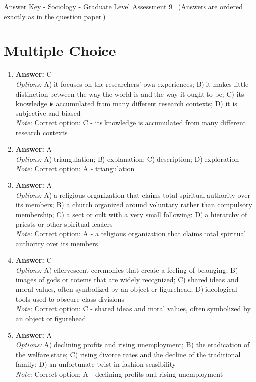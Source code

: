 \documentclass[12pt]{article}
\begin{document}
\begin{center}
Answer Key - Sociology - Graduate Level Assessment 9 \
\small (Answers are ordered exactly as in the question paper.)
\end{center}

\section*{Multiple Choice}
\begin{enumerate}[label=\arabic*.]
\item \textbf{Answer:} C
\\ \textit{Options:} A) it focuses on the researchers' own experiences; B) it makes little distinction between the way the world is and the way it ought to be; C) its knowledge is accumulated from many different research contexts; D) it is subjective and biased
\\ \textit{Note:} Correct option: C - its knowledge is accumulated from many different research contexts
\item \textbf{Answer:} A
\\ \textit{Options:} A) triangulation; B) explanation; C) description; D) exploration
\\ \textit{Note:} Correct option: A - triangulation
\item \textbf{Answer:} A
\\ \textit{Options:} A) a religious organization that claims total spiritual authority over its members; B) a church organized around voluntary rather than compulsory membership; C) a sect or cult with a very small following; D) a hierarchy of priests or other spiritual leaders
\\ \textit{Note:} Correct option: A - a religious organization that claims total spiritual authority over its members
\item \textbf{Answer:} C
\\ \textit{Options:} A) effervescent ceremonies that create a feeling of belonging; B) images of gods or totems that are widely recognized; C) shared ideas and moral values, often symbolized by an object or figurehead; D) ideological tools used to obscure class divisions
\\ \textit{Note:} Correct option: C - shared ideas and moral values, often symbolized by an object or figurehead
\item \textbf{Answer:} A
\\ \textit{Options:} A) declining profits and rising unemployment; B) the eradication of the welfare state; C) rising divorce rates and the decline of the traditional family; D) an unfortunate twist in fashion sensibility
\\ \textit{Note:} Correct option: A - declining profits and rising unemployment
\end{enumerate}
\end{document}
